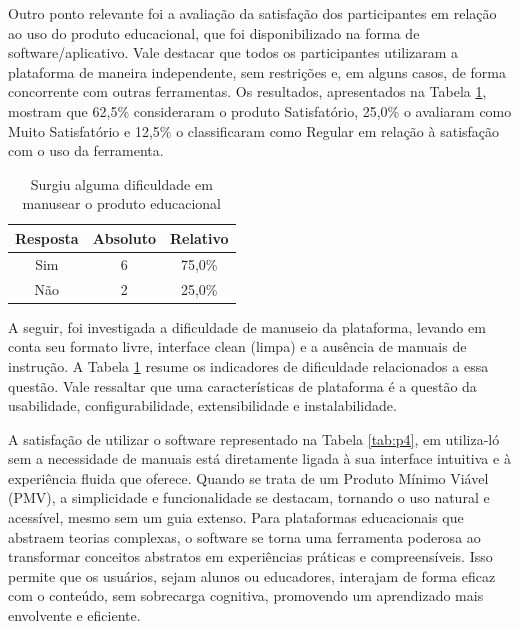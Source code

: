 Outro ponto relevante foi a avaliação da satisfação dos participantes em relação ao uso do produto educacional, que foi disponibilizado na forma de software/aplicativo. Vale destacar que todos os participantes utilizaram a plataforma de maneira independente, sem restrições e, em alguns casos, de forma concorrente com outras ferramentas. Os resultados, apresentados na Tabela \ref{tab:p3}, mostram que 62,5\% consideraram o produto Satisfatório, 25,0\% o avaliaram como Muito Satisfatório e 12,5\% o classificaram como Regular em relação à satisfação com o uso da ferramenta.


\begin{table}[h!]
    \centering
    \caption{Surgiu alguma dificuldade em manusear o produto educacional}
    \begin{tabular}{c|c|c}
        \textbf{Resposta} &	\textbf{Absoluto} & \textbf{Relativo} \\
        \hline
        Sim & 6 & 75,0\% \\
        \hline
        Não & 2 & 25,0\% \\
    \end{tabular}
    \label{tab:p3}
\end{table}




A seguir, foi investigada a dificuldade de manuseio da plataforma, levando em conta seu formato livre, interface clean (limpa) e a ausência de manuais de instrução. A Tabela \ref{tab:p3} resume os indicadores de dificuldade relacionados a essa questão. Vale ressaltar que uma características de plataforma é a questão da usabilidade, configurabilidade, extensibilidade e instalabilidade.


A satisfação de utilizar o software representado na Tabela \ref{tab:p4}, em utiliza-ló sem a necessidade de manuais está diretamente ligada à sua interface intuitiva e à experiência fluida que oferece. Quando se trata de um Produto Mínimo Viável (PMV), a simplicidade e funcionalidade se destacam, tornando o uso natural e acessível, mesmo sem um guia extenso. Para plataformas educacionais que abstraem teorias complexas, o software se torna uma ferramenta poderosa ao transformar conceitos abstratos em experiências práticas e compreensíveis. Isso permite que os usuários, sejam alunos ou educadores, interajam de forma eficaz com o conteúdo, sem sobrecarga cognitiva, promovendo um aprendizado mais envolvente e eficiente.


